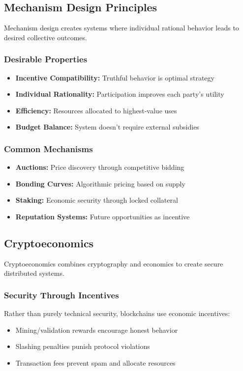 \subsection{Mechanism Design Principles}

Mechanism design creates systems where individual rational behavior leads to desired collective outcomes.

\subsubsection{Desirable Properties}
\begin{itemize}
    \item \textbf{Incentive Compatibility:} Truthful behavior is optimal strategy
    \item \textbf{Individual Rationality:} Participation improves each party's utility
    \item \textbf{Efficiency:} Resources allocated to highest-value uses
    \item \textbf{Budget Balance:} System doesn't require external subsidies
\end{itemize}

\subsubsection{Common Mechanisms}
\begin{itemize}
    \item \textbf{Auctions:} Price discovery through competitive bidding
    \item \textbf{Bonding Curves:} Algorithmic pricing based on supply
    \item \textbf{Staking:} Economic security through locked collateral
    \item \textbf{Reputation Systems:} Future opportunities as incentive
\end{itemize}

\subsection{Cryptoeconomics}

Cryptoeconomics combines cryptography and economics to create secure distributed systems.

\subsubsection{Security Through Incentives}
Rather than purely technical security, blockchains use economic incentives:
\begin{itemize}
    \item Mining/validation rewards encourage honest behavior
    \item Slashing penalties punish protocol violations
    \item Transaction fees prevent spam and allocate resources
\end{itemize}

